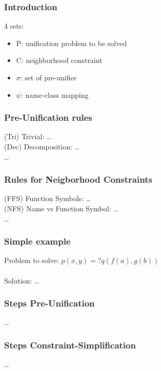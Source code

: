 

	\begin{frame}[fragile=singleslide]
	\frametitle{Introduction}
		4 sets:
		\begin{itemize}
			\item P: unification problem to be solved
			\item C: neighborhood constraint
			\item $\sigma$: set of pre-unifier
			\item $\psi$: name-class mapping
		\end{itemize}
  \end{frame}	
		
		
	\begin{frame}[fragile=singleslide]
	\frametitle{Pre-Unification rules}
		(Tri) Trivial: \ldots \\
		(Dec) Decomposition: \ldots \\
		\ldots
	
  \end{frame}	
		
		
		\begin{frame}[fragile=singleslide]
	\frametitle{Rules for Neigborhood Constraints}
		(FFS) Function Symbols: \ldots \\
		(NFS) Name vs Function Symbol: \ldots \\
		\ldots
	
  \end{frame}	
	
		
		\begin{frame}[fragile=singleslide]
	\frametitle{Simple example}
		Problem to solve: $p(x,y) =? q(f(a),g(b))$\\
		\ \\
		Solution: \ldots
	
  \end{frame}	
	

		\begin{frame}[fragile=singleslide]
	\frametitle{Steps Pre-Unification}
		\ldots
	
  \end{frame}	
	

		\begin{frame}[fragile=singleslide]
	\frametitle{Steps Constraint-Simplification}
		\ldots
	
  \end{frame}	
	
	